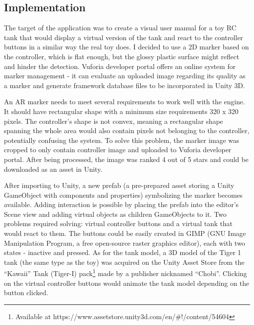 \documentclass[12pt, a4paper]{article}
\begin{document}
\subsection{Implementation}
The target of the application was to create a visual user manual for a toy RC tank that would display a virtual version of the tank and react to the controller buttons in a similar way the real toy does. I decided to use a 2D marker based on the controller, which is flat enough, but the glossy plastic surface might reflect and hinder the detection. Vuforia developer portal offers an online system for marker management - it can evaluate an uploaded image regarding its quality as a marker and generate framework database files to be incorporated in Unity 3D.

An AR marker needs to meet several requirements to work well with the engine. It should have rectangular shape with a minimum size requirements 320 x 320 pixels. The controller’s shape is not convex, meaning a rectangular shape spanning the whole area would also contain pixels not belonging to the controller, potentially confusing the system. To solve this problem, the marker image was cropped to only contain controller image and uploaded to Vuforia developer portal. After being processed, the image was ranked 4 out of 5 stars and could be downloaded as an asset in Unity.


After importing to Unity, a new prefab (a pre-prepared asset storing a Unity GameObject with components and properties) symbolizing the marker becomes available. Adding interaction is possible by placing the prefab into the editor’s Scene view and adding virtual objects as children GameObjects to it. Two problems required solving: virtual controller buttons and a virtual tank that would react to them. The buttons could be easily created in GIMP (GNU Image Manipulation Program, a free open-source raster graphics editor), each with two states - inactive and pressed. As for the tank model, a 3D model of the Tiger 1 tank (the same type as the toy) was acquired on the Unity Asset Store from the “Kawaii” Tank (Tiger-I) pack\footnote{Available at https://www.assetstore.unity3d.com/en/\#!/content/54604} made by a publisher nicknamed “Chobi”. Clicking on the virtual controller buttons would animate the tank model depending on the button clicked.
\end{document}
